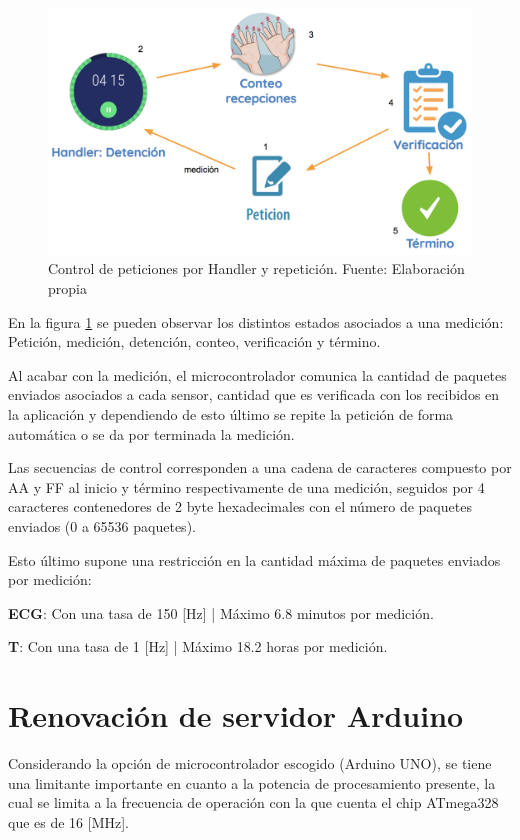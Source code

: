 \begin{figure}[H]
	\centering
	\includegraphics[scale=0.5]{figuras/proto2/handler.png}
	\caption{Control de peticiones por Handler y repetición. Fuente: Elaboración propia}
	\label{handler}
\end{figure}

En la figura \ref{handler} se pueden observar los distintos estados asociados a una medición: Petición, medición, detención, conteo, verificación y término.

Al acabar con la medición, el microcontrolador comunica la cantidad de paquetes enviados asociados a cada sensor, cantidad que es verificada con los recibidos en la aplicación y dependiendo de esto último se repite la petición de forma automática o se da por terminada la medición. \newpage

Las secuencias de control corresponden a una cadena de caracteres compuesto por AA y FF al inicio y término respectivamente de una medición, seguidos por 4 caracteres contenedores de 2 byte hexadecimales con el número de paquetes enviados (0 a 65536 paquetes).

Esto último supone una restricción en la cantidad máxima de paquetes enviados por medición:

\textbf{ECG}: Con una tasa de 150 [Hz] | Máximo 6.8 minutos por medición.

\textbf{T}: Con una tasa de 1 [Hz] | Máximo 18.2 horas por medición.

\section{Renovación de servidor Arduino}

Considerando la opción de microcontrolador escogido (Arduino UNO), se tiene una limitante importante en cuanto a la potencia de procesamiento presente, la cual se limita a la frecuencia de operación con la que cuenta el chip ATmega328 que es de 16 [MHz]. 

